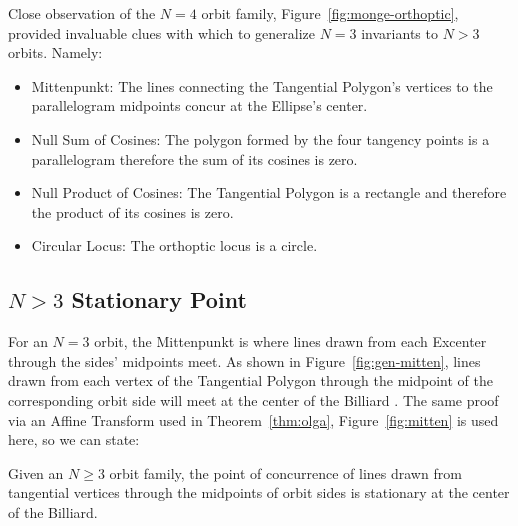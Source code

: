 Close observation of the $N=4$ orbit family, Figure~\ref{fig:monge-orthoptic}, provided invaluable clues with which to generalize $N=3$ invariants to $N>3$ orbits. Namely:

\begin{itemize}
    \item Mittenpunkt: The lines connecting the Tangential Polygon's vertices to the parallelogram midpoints concur at the Ellipse's center.
     \item Null Sum of Cosines: The polygon formed by the four 
     tangency points is a parallelogram therefore the sum of its cosines is zero.
    \item Null Product of Cosines: The Tangential Polygon is a rectangle and therefore the product of its cosines is zero.
   \item Circular Locus: The orthoptic locus is a circle.
\end{itemize}

\subsection{$N>3$ Stationary Point}

For an $N=3$ orbit, the Mittenpunkt is where lines drawn from each Excenter through the sides' midpoints meet. As shown in Figure~\ref{fig:gen-mitten}, lines drawn from each vertex of the Tangential Polygon through the midpoint of the corresponding orbit side will meet at the center of the Billiard \cite[pl\#13]{dsr_math_intell_playlist}. The same proof via an Affine Transform used in Theorem~\ref{thm:olga}, Figure~\ref{fig:mitten} is used here, so we can state:

\begin{theorem}
Given an $N\geq{3}$ orbit family, the point of concurrence of lines drawn from tangential vertices through the midpoints of orbit sides is stationary at the center of the Billiard.
\end{theorem}

